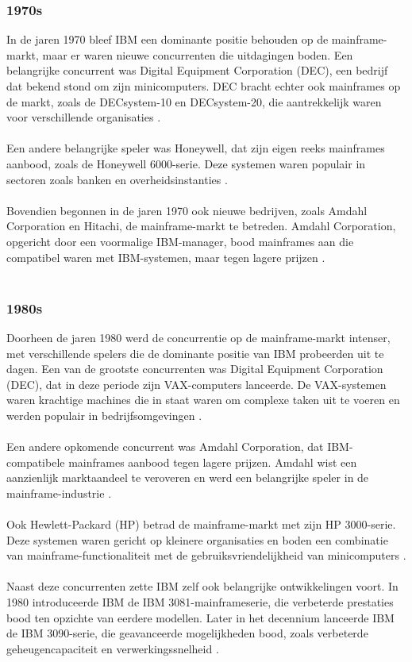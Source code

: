 \subsubsection{1970s}
In de jaren 1970 bleef IBM een dominante positie behouden op de mainframe-markt, maar er waren nieuwe concurrenten die uitdagingen boden. Een belangrijke concurrent was Digital Equipment Corporation (DEC), een bedrijf dat bekend stond om zijn minicomputers. DEC bracht echter ook mainframes op de markt, zoals de DECsystem-10 en DECsystem-20, die aantrekkelijk waren voor verschillende organisaties \autocite{Society2017}.
\\ \\
Een andere belangrijke speler was Honeywell, dat zijn eigen reeks mainframes aanbood, zoals de Honeywell 6000-serie. Deze systemen waren populair in sectoren zoals banken en overheidsinstanties \autocite{Society2017}.
\\ \\
Bovendien begonnen in de jaren 1970 ook nieuwe bedrijven, zoals Amdahl Corporation en Hitachi, de mainframe-markt te betreden. Amdahl Corporation, opgericht door een voormalige IBM-manager, bood mainframes aan die compatibel waren met IBM-systemen, maar tegen lagere prijzen \autocite{Society2017}.
\\ \\
\subsubsection{1980s}
Doorheen de jaren 1980 werd de concurrentie op de mainframe-markt intenser, met verschillende spelers die de dominante positie van IBM probeerden uit te dagen. Een van de grootste concurrenten was Digital Equipment Corporation (DEC), dat in deze periode zijn VAX-computers lanceerde. De VAX-systemen waren krachtige machines die in staat waren om complexe taken uit te voeren en werden populair in bedrijfsomgevingen \autocite{Society2017}.
\\ \\
Een andere opkomende concurrent was Amdahl Corporation, dat IBM-compatibele mainframes aanbood tegen lagere prijzen. Amdahl wist een aanzienlijk marktaandeel te veroveren en werd een belangrijke speler in de mainframe-industrie \autocite{Society2017}.
\\ \\
Ook Hewlett-Packard (HP) betrad de mainframe-markt met zijn HP 3000-serie. Deze systemen waren gericht op kleinere organisaties en boden een combinatie van mainframe-functionaliteit met de gebruiksvriendelijkheid van minicomputers \autocite{Society2017}.
\\ \\
Naast deze concurrenten zette IBM zelf ook belangrijke ontwikkelingen voort. In 1980 introduceerde IBM de IBM 3081-mainframeserie, die verbeterde prestaties bood ten opzichte van eerdere modellen. Later in het decennium lanceerde IBM de IBM 3090-serie, die geavanceerde mogelijkheden bood, zoals verbeterde geheugencapaciteit en verwerkingssnelheid \autocite{Society2017}.
\\ \\
